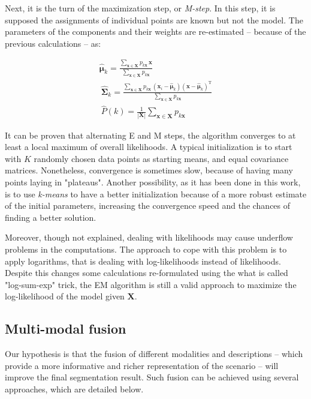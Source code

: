 \documentclass[10pt,twocolumn,letterpaper]{article}
\begin{document}
Next, it is the turn of the maximization step, or \emph{M-step}. In this step, it is supposed the assignments of individual points are known but not the model. The parameters of the components and their weights are re-estimated -- because of the previous calculations -- as:

\begin{gather}
	\hat{\boldsymbol{\mu}}_k = \frac{\sum_{\mathbf{x} \in \mathbf{X}} p_{k\mathbf{x}} \, \mathbf{x}}{\sum_{\mathbf{x} \in \mathbf{X}} p_{k\mathbf{x}}} \\
	~
	\hat{\mathbf{\Sigma}}_k = \frac{\sum_{\mathbf{x} \in \mathbf{X}} p_{k\mathbf{x}} \, (\mathbf{x}_i - \hat{\boldsymbol{\mu}}_k)(\mathbf{x} - \hat{\boldsymbol{\mu}}_k)^{\mathrm{T}} }{\sum_{\mathbf{x} \in \mathbf{X}} p_{k\mathbf{x}}}\\
	~
	\hat{P}(k) = \frac{1}{|\mathbf{X}|} \sum_{\mathbf{x} \in \mathbf{X}} p_{k\mathbf{x}}
\end{gather}

It can be proven that alternating E and M steps, the algorithm converges to at least a local maximum of overall likelihoods. A typical initialization is to start with $K$ randomly chosen data points as starting means, and equal covariance matrices. Nonetheless, convergence is sometimes slow, because of having many points laying in "plateaus". Another possibility, as it has been done in this work, is to use \emph{k-means} to have a better initialization because of a more robust estimate of the initial parameters, increasing the convergence speed and the chances of finding a better solution.

Moreover, though not explained, dealing with likelihoods may cause underflow problems in the computations. The approach to cope with this problem is to apply logarithms, that is dealing with log-likelihoods instead of likelihoods. Despite this changes some calculations re-formulated using the what is called "log-sum-exp" trick, the EM algorithm is still a valid approach to maximize the log-likelihood of the model given $\mathbf{X}$.

\subsection{Multi-modal fusion} 
\label{ssec:fusion}

Our hypothesis is that the fusion of different modalities and descriptions -- which provide a more informative and richer representation of the scenario -- will improve the final segmentation result. Such fusion can be achieved using several approaches, which are detailed below.
 
\end{document}

